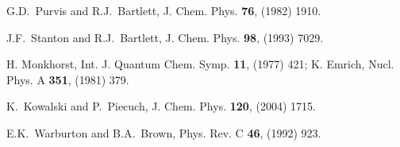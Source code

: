 \documentclass[epj]{svjour}
\begin{document}
\begin{thebibliography}{99}
G.D.~Purvis and R.J.~Bartlett, J. Chem. Phys. {\bf 76}, (1982) 1910.

J.F.~Stanton and R.J.~Bartlett, J. Chem. Phys. {\bf 98}, (1993) 7029.

H. Monkhorst, Int. J. Quantum Chem. Symp. {\bf 11}, (1977) 421;
K. Emrich, Nucl. Phys. A {\bf 351}, (1981) 379.

K.~Kowalski and P.~Piecuch, J. Chem. Phys. {\bf 120}, (2004) 1715.

E.K.~Warburton and B.A.~Brown, Phys. Rev. C {\bf 46}, (1992) 923.

\end{thebibliography}
\end{document}
